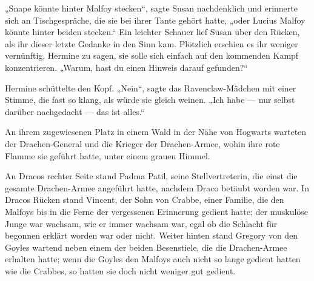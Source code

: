 „Snape könnte hinter Malfoy stecken“, sagte Susan nachdenklich und erinnerte sich an Tischgespräche, die sie bei ihrer Tante gehört hatte, „oder Lucius Malfoy könnte hinter beiden stecken.“ Ein leichter Schauer lief Susan über den Rücken, als ihr dieser letzte Gedanke in den Sinn kam. Plötzlich erschien es ihr weniger vernünftig, Hermine zu sagen, sie solle sich einfach auf den kommenden Kampf konzentrieren.
„Warum, hast du einen Hinweis darauf gefunden?“

Hermine schüttelte den Kopf.
„Nein“, sagte das Ravenclaw-Mädchen mit einer Stimme, die fast so klang, als würde sie gleich weinen.
„Ich habe — nur selbst darüber nachgedacht — das ist alles.“

\later

An ihrem zugewiesenen Platz in einem Wald in der Nähe von Hogwarts warteten der Drachen-General und die Krieger der Drachen-Armee, wohin ihre rote Flamme sie geführt hatte, unter einem grauen Himmel.

An Dracos rechter Seite stand Padma Patil, seine Stellvertreterin, die einst die gesamte Drachen-Armee angeführt hatte, nachdem Draco betäubt worden war. In Dracos Rücken stand Vincent, der Sohn von Crabbe, einer Familie, die den Malfoys bis in die Ferne der vergessenen Erinnerung gedient hatte; der muskulöse Junge war wachsam, wie er immer wachsam war, egal ob die Schlacht für begonnen erklärt worden war oder nicht. Weiter hinten stand Gregory von den Goyles wartend neben einem der beiden Besenstiele, die die Drachen-Armee erhalten hatte; wenn die Goyles den Malfoys auch nicht so lange gedient hatten wie die Crabbes, so hatten sie doch nicht weniger gut gedient.

